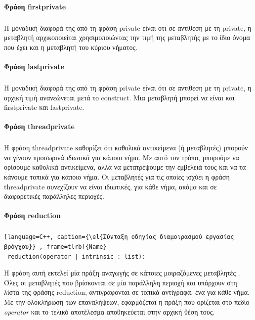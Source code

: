 \documentclass[12pt]{article}
\newcommand{\en}[1]{\foreignlanguage{english}{#1}}
\newcommand{\el}[1]{\selectlanguage{greek}{#1}\selectlanguage{english}}
\begin{document}
\paragraph{Φράση \en{firstprivate}}
\subparagraph{}
Η μόναδική διαφορά της από τη φράση \en{private} είναι οτι σε αντίθεση με τη \en{private}, η μεταβλητή αρχικοποιείται χρησιμοποιώντας την τιμή της μεταβλητής με το ίδιο όνομα που έχει και η μεταβλητή του κύριου νήματος.

\paragraph{Φράση \en{lastprivate}}
\subparagraph{}   

Η μοναδική διαφορά της από τη φράση \en{private} είναι ότι σε αντιθεση με τη private, η αρχική τιμή ανανεώνεται μετά το construct. Μια μεταβλητή μπορεί να είναι και firstprivate και lastprivate.


\paragraph{Φράση \en{threadprivate}}
\subparagraph{}
      Η φράση \en{threadprivate} καθορίζει ότι καθολικά αντικείμενα (ή μεταβλητές) μπορούν να γίνουν προσωρινά ιδιωτικά για κάποιο νήμα. Με αυτό τον τρόπο, μπορούμε να ορίσουμε καθολικά αντικείμενα, αλλά να μετατρέψουμε την εμβέλειά τους και να τα κάνουμε τοπικά για κάποιο νήμα. Οι μεταβλητές για τις οποίες ισχύει η φράση \en{threadprivate} συνεχίζουν να είναι ιδιωτικές, για κάθε νήμα, ακόμα και σε διαφορετικές παράλληλες περιοχές\cite{pdplab}.

\paragraph{Φράση \en{reduction}}
\subparagraph{}    
\begin{lstlisting}[language=C++, caption={\el{Σύνταξη οδηγίας διαμοιρασμού εργασίας βρόγχου}} , frame=tlrb]{Name}
 reduction(operator | intrinsic : list):\end{lstlisting}
    

Η φράση αυτή εκτελεί μία πράξη αναγωγής σε κάποιες μοιραζόμενες μεταβλητές . Όλες οι μεταβλητές που βρίσκονται σε μία παράλληλη περιοχή και υπάρχουν στη λίστα της φράσης reduction, αντιγράφονται σε τοπικά αντίγραφα, ένα για κάθε νήμα. Με την ολοκλήρωση των επαναλήψεων, εφαρμόζεται η πράξη που ορίζεται στο πεδίο \emph{\en{operator}} και το τελικό αποτέλεσμα αποθηκεύεται στην αρχική θέση τους\cite{pdplab}.
\end{document}
